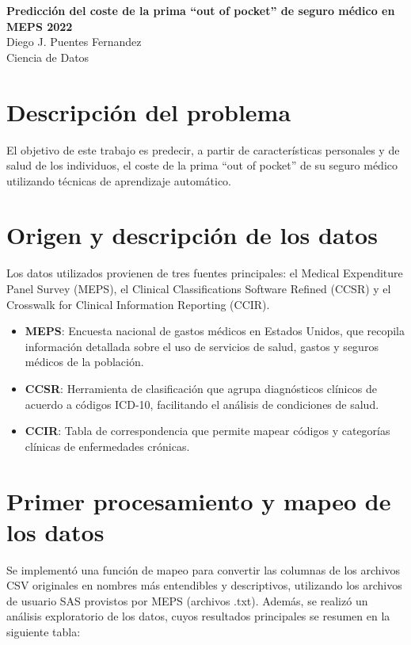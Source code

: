 \documentclass[12pt]{article}
\begin{document}
\begin{titlepage}
    \centering
    {\LARGE\bfseries Predicción del coste de la prima “out of pocket” de seguro médico en MEPS 2022\\[1.5em]}
    \vfill
    {\large Diego J. Puentes Fernandez\\}
    {\large Ciencia de Datos}
\end{titlepage}

\tableofcontents
\newpage

\section{Descripción del problema}
El objetivo de este trabajo es predecir, a partir de características personales y de salud de los individuos, el coste de la prima “out of pocket” de su seguro médico utilizando técnicas de aprendizaje automático.

\section{Origen y descripción de los datos}
Los datos utilizados provienen de tres fuentes principales: el Medical Expenditure Panel Survey (MEPS), el Clinical Classifications Software Refined (CCSR) y el Crosswalk for Clinical Information Reporting (CCIR).

\begin{itemize}
    \item \textbf{MEPS}: Encuesta nacional de gastos médicos en Estados Unidos, que recopila información detallada sobre el uso de servicios de salud, gastos y seguros médicos de la población.
    \item \textbf{CCSR}: Herramienta de clasificación que agrupa diagnósticos clínicos de acuerdo a códigos ICD-10, facilitando el análisis de condiciones de salud.
    \item \textbf{CCIR}: Tabla de correspondencia que permite mapear códigos y categorías clínicas de enfermedades crónicas.
\end{itemize}

\section{Primer procesamiento y mapeo de los datos}
Se implementó una función de mapeo para convertir las columnas de los archivos CSV originales en nombres más entendibles y descriptivos, utilizando los archivos de usuario SAS provistos por MEPS (archivos .txt). Además, se realizó un análisis exploratorio de los datos, cuyos resultados principales se resumen en la siguiente tabla:
\end{document}
